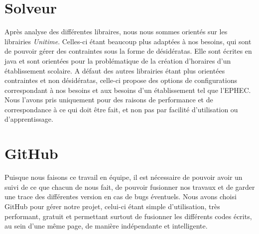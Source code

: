 \section{Solveur}

Après analyse des différentes libraires, nous nous sommes orientés sur les
librairies \textit{Unitime}. Celles-ci étant beaucoup plus adaptées à nos besoins, qui sont de
pouvoir gérer des contraintes sous la forme de désidératas. Elle sont écrites en java et sont orientées pour la problématique de la création d'horaires d'un établissement scolaire. A défaut des autres librairies étant plus orientées contraintes et non désidératas, celle-ci propose des options de configurations correspondant à nos besoins et aux besoins d'un établissement tel que l'EPHEC. Nous l'avons pris uniquement pour des raisons de performance et de correspondance à ce qui doit être fait, et non pas par facilité d'utilisation ou d'apprentissage.

\section{GitHub}
Puisque nous faisons ce travail en équipe, il est nécessaire de pouvoir avoir un suivi de ce que chacun de nous fait, de pouvoir fusionner nos travaux et de garder une trace des différentes version en cas de bugs éventuels. Nous avons choisi GitHub pour gérer notre projet, celui-ci étant simple d'utilisation, très performant, gratuit et permettant surtout de fusionner les différents codes écrits, au sein d'une même page, de manière indépendante et intelligente.

